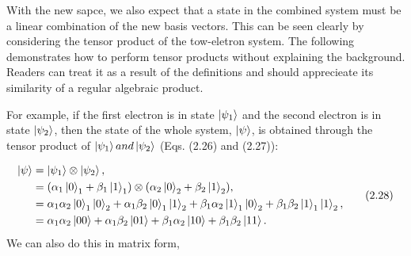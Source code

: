 \documentclass{article}
\begin{document}
With the new sapce, we also expect that a state in the combined system must be a linear combination of the new basis vectors. This can be seen clearly by considering
the tensor product of the tow-eletron system. The following demonstrates how to perform tensor products without explaining the background. Readers can treat it as
a result of the definitions and should apprecieate its similarity of a regular algebraic product.

For example, if the first electron is in state $\ket{\psi_{1}}$ and the second electron is in state $\ket{\psi_{2}}$, then the state of the whole system, $\ket{\psi}$, is obtained
through the tensor product of $\ket{\psi_{1}} and \ket{\psi_{2}}$ (Eqs. (2.26) and (2.27)):

\begin{align}
    \begin{split}
        \ket{\psi}&=\ket{\psi_{1}}\otimes\ket{\psi_{2}},\\
        &=(\alpha_{1}\ket{0}_{1}+\beta_{1}\ket{1}_{1})\otimes(\alpha_{2}\ket{0}_{2}+\beta_{2}\ket{1}_{2}),\\
        &=\alpha_{1}\alpha_{2}\ket{0}_{1}\ket{0}_{2}+\alpha_{1}\beta_{2}\ket{0}_{1}\ket{1}_{2}+\beta_{1}\alpha_{2}\ket{1}_{1}\ket{0}_{2}+\beta_{1}\beta_{2}\ket{1}_{1}\ket{1}_{2},\\
        &=\alpha_{1}\alpha_{2}\ket{00}+\alpha_{1}\beta_{2}\ket{01}+\beta_{1}\alpha_{2}\ket{10}+\beta_{1}\beta_{2}\ket{11}.
    \end{split} \tag{2.28}
\end{align}
We can also do this in matrix form,
\end{document}
